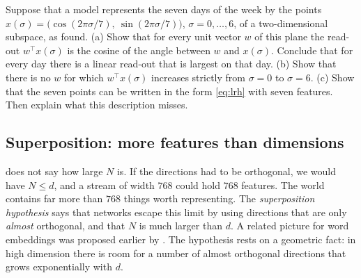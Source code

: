 \begin{exercise}\label{ex:circle}
Suppose that a model represents the seven days of the week by the points
$x(\sigma)=\big(\cos(2\pi\sigma/7),\ \sin(2\pi\sigma/7)\big)$, $\sigma=0,\dots,6$, of a two-dimensional subspace, as
\citet{engels2025not} found. (a) Show that for every unit vector $w$ of this plane the read-out
$w^\top x(\sigma)$ is the cosine of the angle between $w$ and $x(\sigma)$. Conclude that for every day there is a
linear read-out that is largest on that day. (b) Show that there is no $w$ for which $w^\top x(\sigma)$ increases
strictly from $\sigma=0$ to $\sigma=6$. (c) Show that the seven points can be written in the form \eqref{eq:lrh}
with seven features. Then explain what this description misses.
\end{exercise}

\subsection{Superposition: more features than dimensions}
\label{sec:superposition}

 does not say how large $N$ is. If the directions had to be orthogonal, we would have $N\le d$, and
a stream of width $768$ could hold $768$ features. The world contains far more than $768$ things worth
representing. The \emph{superposition hypothesis} \citep{elhage2022toy} says that networks escape this limit by
using directions that are only \emph{almost} orthogonal, and that $N$ is much larger than $d$. A related picture
for word embeddings was proposed earlier by \citet{arora2018linear}. The hypothesis rests on a geometric fact:
in high dimension there is room for a number of almost orthogonal directions that grows exponentially with $d$.

